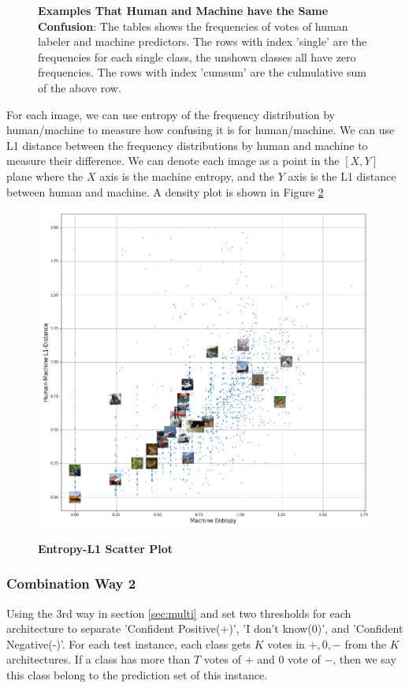 \documentclass{article}
\begin{document}
\begin{figure}[H]
    \caption{\textbf{Examples That Human and Machine have the Same Confusion}: The tables shows the frequencies of votes of human labeler and machine predictors. The rows with index 'single' are the frequencies for each single class, the unshown classes all have zero frequencies. The rows with index 'cumsum' are the culmulative sum of the above row.}
    \label{fig:example_prob}
\end{figure}

For each image, we can use entropy of the frequency distribution by human/machine to measure how confusing it is for human/machine. We can use L1 distance between the frequency distributions by human and machine to measure their difference. We can denote each image as a point in the $\left[X,Y\right]$ plane where the $X$ axis is the machine entropy, and the $Y$ axis is the L1 distance between human and machine. A density plot is shown in Figure \ref{l1entropyscatter}

\begin{figure}[H]
    \centering
    \includegraphics[scale=0.4]{figs/l1_entropy_scatter.png}
    \label{l1entropyscatter}
    \caption{\textbf{Entropy-L1 Scatter Plot}}
\end{figure}

\subsubsection{Combination Way 2}
Using the 3rd way in section \ref{sec:multi} and set two thresholds for each architecture to separate 'Confident Positive(+)', 'I don't know(0)', and 'Confident Negative(-)'. For each test instance, each class gets $K$ votes in ${+,0,-}$ from the $K$ architectures. If a class has more than $T$ votes of $+$ and 0 vote of $-$, then we say this class belong to the prediction set of this instance.
\end{document}
